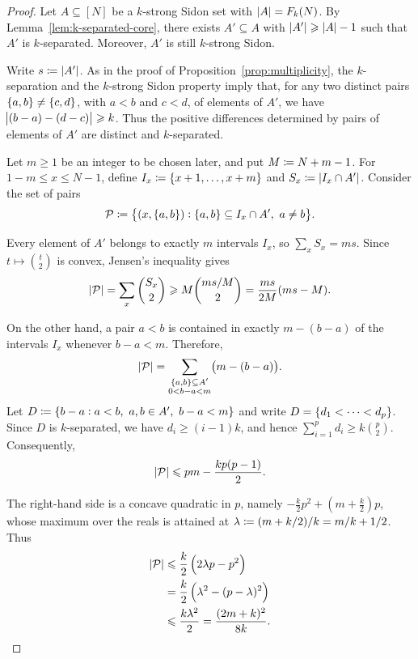 \documentclass[reqno,a4paper,12pt]{amsart}
\begin{document}
\begin{proof}
    Let \(A\subseteq[N]\) be a \(k\)-strong Sidon set with
    \(\card{A}=F_k(N)\).
    By Lemma~\ref{lem:k-separated-core}, there exists
    \(A'\subseteq A\) with \(\card{A'}\geq\card{A}-1\) such that
    \(A'\) is \(k\)-separated. Moreover, \(A'\) is still
    \(k\)-strong Sidon.

    Write \(s\defined\card{A'}\).
    As in the proof of Proposition~\ref{prop:multiplicity}, the
    \(k\)-separation and the \(k\)-strong Sidon property imply that,
    for any two distinct pairs
    \(\set{a,b}\neq\set{c,d}\), with \(a<b\) and \(c<d\),
    of elements of \(A'\), we have
    \(\abs{(b-a)-(d-c)}\geq k\).
    Thus the positive differences determined by pairs of elements of
    \(A'\) are distinct and \(k\)-separated.

    Let \(m\geq1\) be an integer to be chosen later, and put
    \(M\defined N+m-1\).
    For \(1-m\leq x\leq N-1\), define
    \(I_x\defined\set{x+1,\dotsc,x+m}\) and
    \(S_x\defined\card{I_x\cap A'}\).
    Consider the set of pairs
    \[
        \cP
        \defined
        \set[\big]{
            (x,\set{a,b}):
            \set{a,b}\subseteq I_x\cap A',\
            a\neq b
        }.
    \]

    Every element of \(A'\) belongs to exactly \(m\) intervals \(I_x\),
    so \(\sum_x S_x=ms\).
    Since \(t\mapsto\binom t2\) is convex, Jensen's inequality gives
    \begin{equation}
        \label{eq:extremal-lower}
        \card{\cP}
        =
        \sum_x\binom{S_x}{2}
        \geq
        M\binom{ms/M}{2}
        =
        \frac{ms}{2M}(ms-M).
    \end{equation}

    On the other hand, a pair \(a<b\) is contained in exactly
    \(m-(b-a)\) of the intervals \(I_x\) whenever \(b-a<m\).
    Therefore,
    \[
        \card{\cP}
        =
        \sum_{\substack{\set{a,b}\subseteq A'\\0<b-a<m}}
        \bigl(m-(b-a)\bigr).
    \]
    Let
    \(D\defined\set{b-a: a<b,\ a,b\in A',\ b-a<m}\)
    and write \(D=\set{d_1<\dotsb<d_p}\).
    Since \(D\) is \(k\)-separated, we have \(d_i\geq(i-1)k\), and hence
    \(\sum_{i=1}^p d_i \geq k\binom p2\).
    Consequently,
    \[
        \card{\cP}
        \leq
        pm-\frac{kp(p-1)}2.
    \]

    The right-hand side is a concave quadratic in \(p\), namely
    \(-\frac{k}{2}p^2 + (m+\frac{k}{2})p\),
    whose maximum over the reals is attained at
    \(\lambda \defined (m+k/2)/k = m/k+1/2\).
    Thus
    \begin{align*}
        \card{\cP}
         & \leq
        \frac{k}{2}
        \left(
        2\lambda p-p^2
        \right) \\
         & =
        \frac{k}{2}
        \left(
        \lambda^2-(p-\lambda)^2
        \right) \\
         & \leq
        \frac{k\lambda^2}{2}
        =
        \frac{(2m+k)^2}{8k}.
    \end{align*}


\end{proof}
\end{document}
